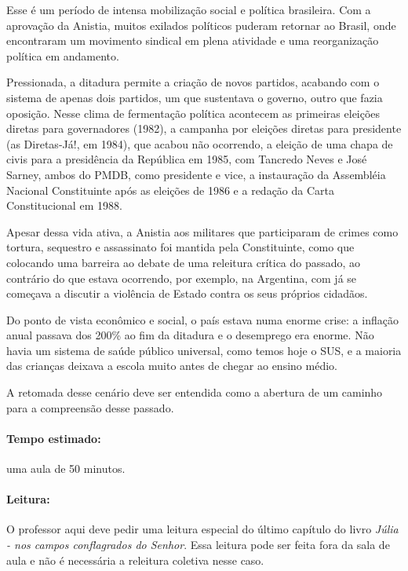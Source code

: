 \documentclass[12pt]{extarticle}
\begin{document}
Esse é um período de intensa mobilização social e política brasileira.
Com a aprovação da Anistia, muitos exilados políticos puderam retornar
ao Brasil, onde encontraram um movimento sindical em plena atividade e
uma reorganização política em andamento.

Pressionada, a ditadura permite a criação de novos partidos, acabando
com o sistema de apenas dois partidos, um que sustentava o governo,
outro que fazia oposição. Nesse clima de fermentação política acontecem
as primeiras eleições diretas para governadores (1982), a campanha por
eleições diretas para presidente (as Diretas-Já!, em 1984), que acabou
não ocorrendo, a eleição de uma chapa de civis para a presidência da
República em 1985, com Tancredo Neves e José Sarney, ambos do PMDB, como
presidente e vice, a instauração da Assembléia Nacional Constituinte
após as eleições de 1986 e a redação da Carta Constitucional em 1988.



Apesar dessa vida ativa, a Anistia aos militares que participaram de
crimes como tortura, sequestro e assassinato foi mantida pela
Constituinte, como que colocando uma barreira ao debate de uma releitura
crítica do passado, ao contrário do que estava ocorrendo, por exemplo,
na Argentina, com já se começava a discutir a violência de Estado contra
os seus próprios cidadãos.



Do ponto de vista econômico e social, o país estava numa enorme crise: a
inflação anual passava dos 200\% ao fim da ditadura e o desemprego era
enorme. Não havia um sistema de saúde público universal, como temos hoje
o SUS, e a maioria das crianças deixava a escola muito antes de chegar
ao ensino médio.

A retomada desse cenário deve ser entendida como a abertura de um
caminho para a compreensão desse passado.

\paragraph{Tempo estimado:} uma aula de 50 minutos.

\paragraph{Leitura:}

O professor aqui deve pedir uma leitura especial do último capítulo do
livro \emph{Júlia - nos campos conflagrados do Senhor}. Essa leitura
pode ser feita fora da sala de aula e não é necessária a releitura
coletiva nesse caso.
\end{document}
